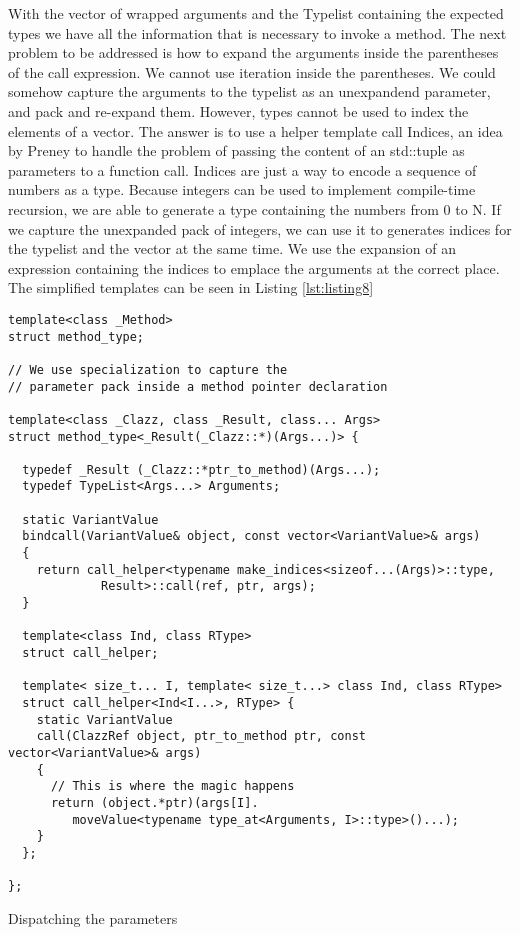 With the vector of wrapped arguments and the Typelist containing the expected types we have all the information that is necessary to
invoke a method. The next problem to be addressed is how to expand the arguments inside the parentheses of the call expression.
We cannot use iteration inside the parentheses. We could somehow capture the arguments to the typelist as an unexpandend parameter,
and pack and re-expand them. However, types cannot be used to index the elements of a vector. The answer is to use a helper template
call Indices, an idea by Preney\cite{Preney} to handle the problem of passing the content of an std::tuple as parameters to a function
call. Indices are just a way to encode a sequence of numbers as a type. Because integers can be used to implement compile-time recursion,
we are able to generate a type containing the numbers from 0 to N. If we capture the unexpanded pack of integers, we can use it to
generates indices for the typelist and the vector at the same time. We use the expansion of an expression containing the indices to
emplace the arguments at the correct place. The simplified templates can be seen in Listing \ref{lst:listing8}

\begin{listing}[H]
\begin{verbatim}
template<class _Method>
struct method_type;

// We use specialization to capture the
// parameter pack inside a method pointer declaration

template<class _Clazz, class _Result, class... Args>
struct method_type<_Result(_Clazz::*)(Args...)> {
  
  typedef _Result (_Clazz::*ptr_to_method)(Args...);
  typedef TypeList<Args...> Arguments;

  static VariantValue
  bindcall(VariantValue& object, const vector<VariantValue>& args)
  {
    return call_helper<typename make_indices<sizeof...(Args)>::type,
             Result>::call(ref, ptr, args);
  }

  template<class Ind, class RType>
  struct call_helper;

  template< size_t... I, template< size_t...> class Ind, class RType>
  struct call_helper<Ind<I...>, RType> {
    static VariantValue
    call(ClazzRef object, ptr_to_method ptr, const vector<VariantValue>& args)
    {
      // This is where the magic happens
      return (object.*ptr)(args[I].
         moveValue<typename type_at<Arguments, I>::type>()...);
    }
  };

};
\end{verbatim}
\caption{Dispatching the parameters}
\label{lst:listing8}
\end{listing}

